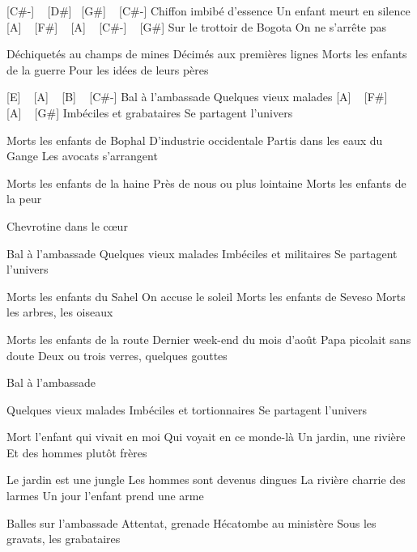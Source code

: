
[C#-] ~ [D#] ~[G#] ~ [C#-]
Chiffon imbibé d'essence
Un enfant meurt en silence
[A] ~ [F#] ~ [A] ~ [C#-] ~ [G#]
Sur le trottoir de Bogota
On ne s'arrête pas


Déchiquetés au champs de mines
Décimés aux premières lignes
Morts les enfants de la guerre
Pour les idées de leurs pères

[E] ~ [A] ~ [B] ~ [C#-]
Bal à l'ambassade
Quelques vieux malades
[A] ~ [F#] ~ [A] ~ [G#]
Imbéciles et grabataires
Se partagent l'univers

Morts les enfants de Bophal
D'industrie occidentale
Partis dans les eaux du Gange
Les avocats s'arrangent

Morts les enfants de la haine
Près de nous ou plus lointaine
Morts les enfants de la peur

Chevrotine dans le cœur

Bal à l'ambassade
Quelques vieux malades
Imbéciles et militaires
Se partagent l'univers

Morts les enfants du Sahel
On accuse le soleil
Morts les enfants de Seveso
Morts les arbres, les oiseaux

Morts les enfants de la route
Dernier week-end du mois d'août
Papa picolait sans doute
Deux ou trois verres, quelques gouttes

Bal à l'ambassade

Quelques vieux malades
Imbéciles et tortionnaires
Se partagent l'univers

Mort l'enfant qui vivait en moi
Qui voyait en ce monde-là
Un jardin, une rivière
Et des hommes plutôt frères

Le jardin est une jungle
Les hommes sont devenus dingues
La rivière charrie des larmes
Un jour l'enfant prend une arme

Balles sur l'ambassade
Attentat, grenade
Hécatombe au ministère
Sous les gravats, les grabataires

